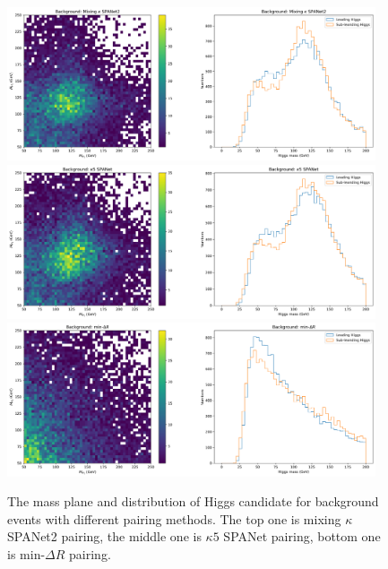 \documentclass[12pt]{article}
\begin{document}
		\begin{figure}[htpb]
			\centering
			\includegraphics[width=0.97\textwidth]{Higgs_mass_mix-SPANET2_b.png}
			\includegraphics[width=0.97\textwidth]{Higgs_mass_k5-SPANET_b.png}
			\includegraphics[width=0.97\textwidth]{Higgs_mass_mindR_b.png}
			\caption{The mass plane and distribution of Higgs candidate for background events with different pairing methods. The top one is mixing $\kappa$ SPANet2 pairing, the middle one is $\kappa 5$ SPANet pairing, bottom one is $\text{min-}\Delta R$ pairing.}
			\label{fig:Higgs_mass_background}
		\end{figure}
\end{document}
